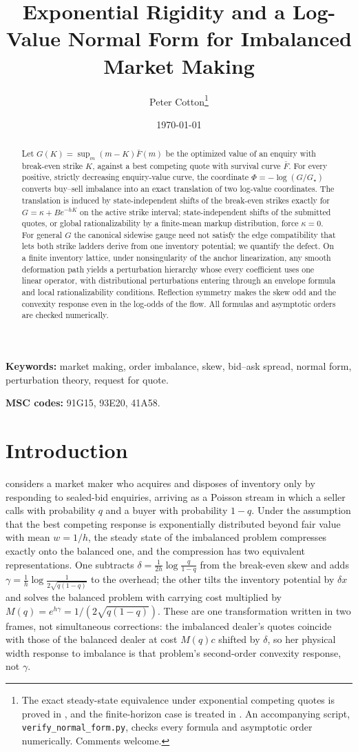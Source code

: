 \documentclass[11pt]{article}
\title{\textbf{Exponential Rigidity and a Log-Value Normal Form for Imbalanced Market Making}}
\author{Peter Cotton\thanks{The exact steady-state equivalence under exponential competing quotes is proved in \citet{cotton2026skew}, and the finite-horizon case is treated in \citet{cotton2026finite}. An accompanying script, \texttt{verify\_normal\_form.py}, checks every formula and asymptotic order numerically. Comments welcome.}}
\date{\today}
\newcommand{\Fbar}{\bar F}
\begin{document}
\maketitle

\begin{abstract}
Let $G(K) = \sup_m (m-K)\Fbar(m)$ be the optimized value of an enquiry with break-even strike $K$, against a best competing quote with survival curve $\Fbar$. For every positive, strictly decreasing enquiry-value curve, the coordinate $\Phi = -\log(G/G_\star)$ converts buy--sell imbalance into an exact translation of two log-value coordinates. The translation is induced by state-independent shifts of the break-even strikes exactly for $G = \kappa + Be^{-hK}$ on the active strike interval; state-independent shifts of the submitted quotes, or global rationalizability by a finite-mean markup distribution, force $\kappa = 0$. For general $G$ the canonical sidewise gauge need not satisfy the edge compatibility that lets both strike ladders derive from one inventory potential; we quantify the defect. On a finite inventory lattice, under nonsingularity of the anchor linearization, any smooth deformation path yields a perturbation hierarchy whose every coefficient uses one linear operator, with distributional perturbations entering through an envelope formula and local rationalizability conditions. Reflection symmetry makes the skew odd and the convexity response even in the log-odds of the flow. All formulas and asymptotic orders are checked numerically.
\end{abstract}

\medskip
\noindent\textbf{Keywords:} market making, order imbalance, skew, bid--ask spread, normal form, perturbation theory, request for quote.

\noindent\textbf{MSC codes:} 91G15, 93E20, 41A58.

\section{Introduction}

\citet{cotton2026skew} considers a market maker who acquires and disposes of inventory only by responding to sealed-bid enquiries, arriving as a Poisson stream in which a seller calls with probability $q$ and a buyer with probability $1-q$. Under the assumption that the best competing response is exponentially distributed beyond fair value with mean $w = 1/h$, the steady state of the imbalanced problem compresses exactly onto the balanced one, and the compression has two equivalent representations. One subtracts $\delta = \tfrac{1}{2h}\log\tfrac{q}{1-q}$ from the break-even skew and adds $\gamma = \tfrac1h \log \tfrac{1}{2\sqrt{q(1-q)}}$ to the overhead; the other tilts the inventory potential by $\delta x$ and solves the balanced problem with carrying cost multiplied by $M(q) = e^{h\gamma} = 1/(2\sqrt{q(1-q)})$. These are one transformation written in two frames, not simultaneous corrections: the imbalanced dealer's quotes coincide with those of the balanced dealer at cost $M(q)c$ shifted by $\delta$, so her physical width response to imbalance is that problem's second-order convexity response, not $\gamma$.
\end{document}
